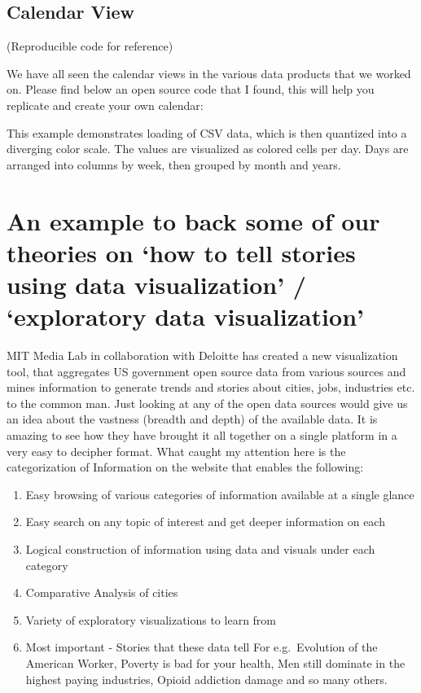 \documentclass[]{book}
\providecommand{\tightlist}{%
  \setlength{\itemsep}{0pt}\setlength{\parskip}{0pt}}
\theoremstyle{definition}
\theoremstyle{definition}
\theoremstyle{definition}
\theoremstyle{remark}
\begin{document}
\subsection{Calendar View}\label{calendar-view}

(Reproducible code for reference)

\citep{Calendar_Layout} We have all seen the calendar views in the
various data products that we worked on. Please find below an open
source code that I found, this will help you replicate and create your
own calendar: \citep{CalendarView}

This example demonstrates loading of CSV data, which is then quantized
into a diverging color scale. The values are visualized as colored cells
per day. Days are arranged into columns by week, then grouped by month
and years.

\section{\texorpdfstring{An example to back some of our theories on `how
to tell stories using data visualization' / `exploratory data
visualization'}{An example to back some of our theories on how to tell stories using data visualization / exploratory data visualization}}\label{an-example-to-back-some-of-our-theories-on-how-to-tell-stories-using-data-visualization-exploratory-data-visualization}

\citep{DataUSA} MIT Media Lab in collaboration with Deloitte has created
a new visualization tool, that aggregates US government open source data
from various sources and mines information to generate trends and
stories about cities, jobs, industries etc. to the common man. Just
looking at any of the open data sources would give us an idea about the
vastness (breadth and depth) of the available data. It is amazing to see
how they have brought it all together on a single platform in a very
easy to decipher format. What caught my attention here is the
categorization of Information on the website that enables the following:

\begin{enumerate}
\def\labelenumi{\arabic{enumi}.}
\tightlist
\item
  Easy browsing of various categories of information available at a
  single glance
\item
  Easy search on any topic of interest and get deeper information on
  each
\item
  Logical construction of information using data and visuals under each
  category
\item
  Comparative Analysis of cities
\item
  Variety of exploratory visualizations to learn from
\item
  Most important - Stories that these data tell For e.g.~Evolution of
  the American Worker, Poverty is bad for your health, Men still
  dominate in the highest paying industries, Opioid addiction damage and
  so many others.
\end{enumerate}
\end{document}
